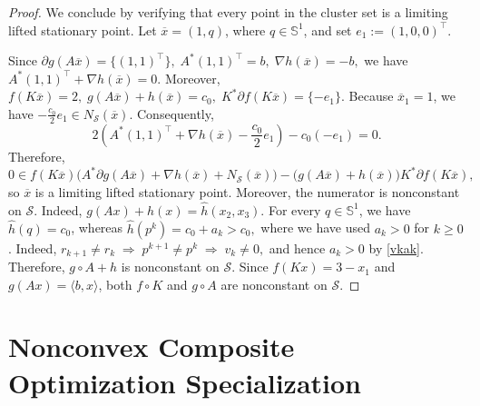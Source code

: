 \documentclass[11pt]{article}
\numberwithin{equation}{section}
\begin{document}
\begin{proof}
We conclude by verifying that every point in the cluster set is a limiting lifted stationary point.
Let \(\overline x=(1,q)\), where \(q\in\mathbb S^1\), and set
\(e_1:=(1,0,0)^\top\).

Since
$
\partial g(A\overline x)=\{(1,1)^\top\},\;
A^*(1,1)^\top=b,\;
\nabla h(\overline x)=-b,
$
we have
$
A^*(1,1)^\top+\nabla h(\overline x)=0.
$
Moreover,
$
f(K\overline x)=2,\;
g(A\overline x)+h(\overline x)=c_0,\;
K^*\partial f(K\overline x)=\{-e_1\}.
$
Because \(\overline x_1=1\), we have
$
-\frac{c_0}{2}e_1\in N_{\mathcal S}(\overline x).
$
Consequently,
$$
2\left(
A^*(1,1)^\top+\nabla h(\overline x)-\frac{c_0}{2}e_1
\right)
-c_0(-e_1)=0.
$$
Therefore,
$
0\in
f(K\overline x)\bigl(
A^*\partial g(A\overline x)+\nabla h(\overline x)+N_{\mathcal S}(\overline x)
\bigr)
-\bigl(g(A\overline x)+h(\overline x)\bigr)K^*\partial f(K\overline x),
$
so \(\overline x\) is a limiting lifted stationary point.
Moreover, the numerator is nonconstant on $\mathcal S$. Indeed,
$g(Ax)+h(x)=\widehat h(x_2,x_3).$
For every $q\in\mathbb S^1$, we have $\widehat h(q)=c_0$, whereas
$
\widehat h(p^k)=c_0+a_k>c_0,
$
where we have used $a_k>0$ for $k\geq 0$. Indeed,
$
r_{k+1}\neq r_k
\;\Longrightarrow\;
p^{k+1}\neq p^k
\;\Longrightarrow\;
v_k\neq 0,
$
and hence $a_k>0$ by \eqref{vkak}. Therefore, $g\circ A +h $ is nonconstant on \(\mathcal S\).
Since \(f(Kx)=3-x_1\) and \(g(Ax)=\langle b,x\rangle\),
both \(f\circ K\) and \(g\circ A\) are nonconstant on \(\mathcal S\).
\end{proof}
\section{Nonconvex  Composite Optimization Specialization}\label{sec:com}

\end{document}
